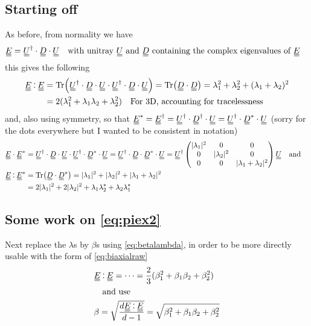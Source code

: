 \documentclass[11pt]{article}
\begin{document}
\subsection{Starting off}
As before, from normality we have
\begin{equation}
    \du{E} = \du{U}^\dagger \cdot \du{D} \cdot \du{U} \qq{with unitray $\du{U}$ and $\du{D}$ containing the complex eigenvalues of \EE}
\end{equation}
    this gives the following
\begin{align}
    \du{E} \cddot \du{E} &= \Tr(\du{U}^\dagger \cdot \du{D} \cdot \du{U} \cdot \du{U}^\dagger \cdot \du{D} \cdot \du{U}) = \Tr(\du{D} \cdot\du{D}) = \lambda_1^2 + \lambda_2^2 + (\lambda_1 + \lambda_2)^2 \\
    &= 2(\lambda_1^2 +\lambda_1\lambda_2 + \lambda_2^2) \qq{For 3D, accounting for tracelessness} \\
\end{align}
and, also using symmetry, so that $\du{E}^* = \du{E}^\dagger = \du{U}^\dagger \cdot \du{D}^\dagger \cdot \du{U} = \du{U}^\dagger \cdot \du{D}^* \cdot \du{U}$ (sorry for the dots everywhere but I wanted to be consistent in notation)
\begin{align}
    \du{E} \cdot \du{E}^* &=  \du{U}^\dagger \cdot \du{D} \cdot \du{U} \cdot \du{U}^\dagger \cdot \du{D}^* \cdot \du{U} = \du{U}^\dagger \cdot \du{D} \cdot \du{D}^* \cdot \du{U} = \du{U}^\dagger \begin{pmatrix} |\lambda_1|^2 & 0 & 0 \\ 0 & |\lambda_2|^2 & 0 \\ 0 & 0 & |\lambda_1 + \lambda_2|^2 \\ \end{pmatrix} \du{U} \qq{and} \\
    \du{E} \cddot \du{E}^* &=  \Tr(\du{D} \cdot \du{D}^*) = |\lambda_1|^2 + |\lambda_2|^2 + |\lambda_1 + \lambda_2|^2 \\
    &= 2|\lambda_1|^2 + 2|\lambda_2|^2 + \lambda_1\lambda_2^* + \lambda_2\lambda_1^*
\end{align}

\subsection{Some work on \cref{eq:piex2}}
Next replace the $\lambda$s by $\beta$s using \cref{eq:betalambda}, in order to be more directly usable with the form of \cref{eq:biaxialraw}
\begin{align}
    &\du{E} \cddot \du{E} = \cdots = \frac{2}{3}(\beta_1^2 + \beta_1\beta_2 + \beta_2^2) \\
    &\qq{and use} \\
    &\beta = \sqrt{\frac{d \du{E} \cddot \du{E}}{d-1}} = \sqrt{\beta_1^2 + \beta_1\beta_2 + \beta_2^2}
\end{align}
\end{document}
